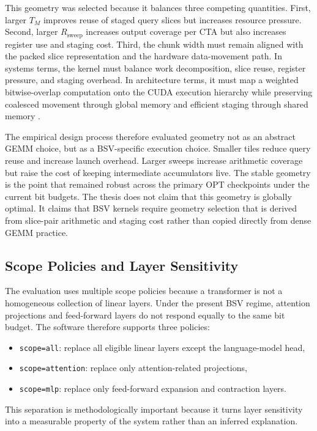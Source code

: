 This geometry was selected because it balances three competing quantities. First, larger $T_M$ improves reuse of staged query slices but increases resource pressure. Second, larger $R_{\mathrm{sweep}}$ increases output coverage per CTA but also increases register use and staging cost. Third, the chunk width must remain aligned with the packed slice representation and the hardware data-movement path. In systems terms, the kernel must balance work decomposition, slice reuse, register pressure, and staging overhead. In architecture terms, it must map a weighted bitwise-overlap computation onto the CUDA execution hierarchy while preserving coalesced movement through global memory and efficient staging through shared memory \cite{nvidia_cuda_guide,nvidia_hopper_tuning,nvidia_ptx_isa}.

The empirical design process therefore evaluated geometry not as an abstract GEMM choice, but as a BSV-specific execution choice. Smaller tiles reduce query reuse and increase launch overhead. Larger sweeps increase arithmetic coverage but raise the cost of keeping intermediate accumulators live. The stable geometry is the point that remained robust across the primary OPT checkpoints under the current bit budgets. The thesis does not claim that this geometry is globally optimal. It claims that BSV kernels require geometry selection that is derived from slice-pair arithmetic and staging cost rather than copied directly from dense GEMM practice.

\subsection{Scope Policies and Layer Sensitivity}
The evaluation uses multiple scope policies because a transformer is not a homogeneous collection of linear layers. Under the present BSV regime, attention projections and feed-forward layers do not respond equally to the same bit budget. The software therefore supports three policies:
\begin{itemize}[leftmargin=2em]
\item \texttt{scope=all}: replace all eligible linear layers except the language-model head,
\item \texttt{scope=attention}: replace only attention-related projections,
\item \texttt{scope=mlp}: replace only feed-forward expansion and contraction layers.
\end{itemize}
This separation is methodologically important because it turns layer sensitivity into a measurable property of the system rather than an inferred explanation.

